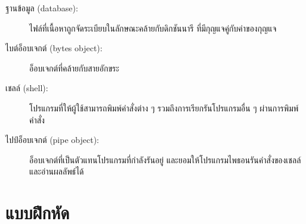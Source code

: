 \begin{description}

\item[ฐานข้อมูล (database):] 
ไฟล์ที่เนื้อหาถูกจัดระเบียบในลักษณะคล้ายกับดิกชันนารี ที่มีกุญแจคู่กับค่าของกุญแจ


\item[ไบต์อ็อบเจกต์ (bytes object):] 
อ็อบเจกต์ที่คล้ายกับสายอักขระ



\item[เชลล์ (shell):] 
โปรแกรมที่ให้ผู้ใช้สามารถพิมพ์คำสั่งต่าง ๆ รวมถึงการเรียกรันโปรแกรมอื่น ๆ ผ่านการพิมพ์คำสั่ง



\item[ไปป์อ็อบเจกต์ (pipe object):] 
อ็อบเจกต์ที่เป็นตัวแทนโปรแกรมที่กำลังรันอยู่
และยอมให้โปรแกรมไพธอนรันคำสั่งของเชลล์และอ่านผลลัพธ์ได้

\end{description}

\section{แบบฝึกหัด}

